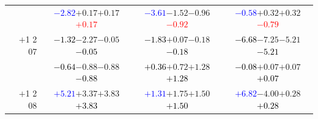 \documentclass[compress]{beamer}
\begin{document}
\begin{frame}
\begin{tabular}{r | c | c | c}
          & \textcolor{blue}{$-2.82$}\hspace{0.1 cm}$+0.17$\hspace{0.1 cm}$+0.17$\hspace{0.1 cm}\textcolor{red}{$+0.17$} & \textcolor{blue}{$-3.61$}\hspace{0.1 cm}$-1.52$\hspace{0.1 cm}$-0.96$\hspace{0.1 cm}\textcolor{red}{$-0.92$} & \textcolor{blue}{$-0.58$}\hspace{0.1 cm}$+0.32$\hspace{0.1 cm}$+0.32$\hspace{0.1 cm}\textcolor{red}{$-0.79$} \\
$+$1 2 07 & \textcolor{black}{$-1.32$}\hspace{0.1 cm}$-2.27$\hspace{0.1 cm}$-0.05$\hspace{0.1 cm}\textcolor{black}{$-0.05$} & \textcolor{black}{$-1.83$}\hspace{0.1 cm}$+0.07$\hspace{0.1 cm}$-0.18$\hspace{0.1 cm}\textcolor{black}{$-0.18$} & \textcolor{black}{$-6.68$}\hspace{0.1 cm}$-7.25$\hspace{0.1 cm}$-5.21$\hspace{0.1 cm}\textcolor{black}{$-5.21$} \\
          & \textcolor{black}{$-0.64$}\hspace{0.1 cm}$-0.88$\hspace{0.1 cm}$-0.88$\hspace{0.1 cm}\textcolor{black}{$-0.88$} & \textcolor{black}{$+0.36$}\hspace{0.1 cm}$+0.72$\hspace{0.1 cm}$+1.28$\hspace{0.1 cm}\textcolor{black}{$+1.28$} & \textcolor{black}{$-0.08$}\hspace{0.1 cm}$+0.07$\hspace{0.1 cm}$+0.07$\hspace{0.1 cm}\textcolor{black}{$+0.07$} \\
$+$1 2 08 & \textcolor{blue}{$+5.21$}\hspace{0.1 cm}$+3.37$\hspace{0.1 cm}$+3.83$\hspace{0.1 cm}\textcolor{black}{$+3.83$} & \textcolor{blue}{$+1.31$}\hspace{0.1 cm}$+1.75$\hspace{0.1 cm}$+1.50$\hspace{0.1 cm}\textcolor{black}{$+1.50$} & \textcolor{blue}{$+6.82$}\hspace{0.1 cm}$-4.00$\hspace{0.1 cm}$+0.28$\hspace{0.1 cm}\textcolor{black}{$+0.28$} \\

\end{tabular}
\end{frame}
\end{document}
